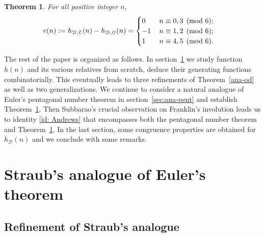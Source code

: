 \documentclass[12pt]{amsart}
\numberwithin{equation}{section}
\theoremstyle{plain}
\newtheorem{theorem}{Theorem}[section]
\theoremstyle{definition}
\def\D{\mathcal{D}}
\def\O{\mathcal{O}}
\def\E{\mathcal{E}}
\begin{document}
\begin{theorem}\label{ana-pent}
For all positive integer $n$,
\begin{align}\label{id:ana-pent}
e(n) &:=h_{\D,\E}(n)-h_{\D,\O}(n)=
\begin{cases}
0\, &n\equiv 0,3\pmod {6};\cr -1\, &n\equiv 1,2\pmod {6};\cr 1\, &n\equiv 4,5\pmod {6}.\end{cases}
\end{align}
\end{theorem}

The rest of the paper is organized as follows. In section~\ref{sec:ana-od} we study function $h(n)$ and its various relatives from scratch, deduce their generating functions combinatorially. This eventually leads to three refinements of Theorem~\ref{ana-od} as well as two generalizations. We continue to consider a natural analogue of Euler's pentagonal number theorem in section~\ref{sec:ana-pent} and establish Theorem~\ref{ana-pent}. Then Subbarao's crucial observation \cite{Sub} on Franklin's involution leads us to identity \eqref{id: Andrews} that encompasses both the pentagonal number theorem and Theorem~\ref{ana-pent}. In the last section, some congruence properties are obtained for $h_{\D}(n)$ and we conclude with some remarks.


\section{Straub's analogue of Euler's theorem}\label{sec:ana-od}

\subsection{Refinement of Straub's analogue}
\end{document}
